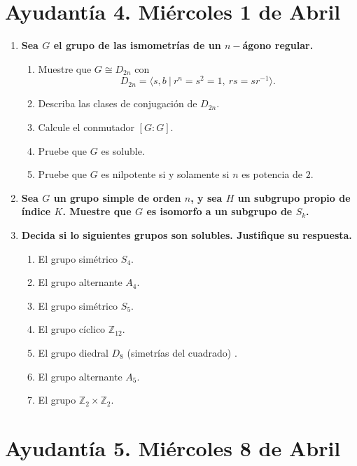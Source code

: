 \documentclass{article}
\theoremstyle{definition}
\theoremstyle{remark}
\numberwithin{equation}{section}
\begin{document}
\newpage
\section{Ayudantía 4. Miércoles 1 de Abril}


\begin{enumerate}

\item \textbf{Sea $G$ el grupo de las ismometrías de un $n-$ágono regular.}

\begin{enumerate}
\item Muestre que $G \cong D_{2n}$ con 
$$D_{2n}= \langle s,b \ | \ r^n=s^2=1, \ rs=sr^{-1} \rangle.$$
\item Describa las clases de conjugación de $D_{2n}$.

\item Calcule el conmutador $[G:G].$
\item Pruebe que $G$ es soluble.
\item Pruebe que $G$ es nilpotente si y solamente si $n$ es potencia de $2$.

\end{enumerate}
\item \textbf{Sea $G$ un grupo simple de orden $n$, y sea $H$ un subgrupo propio de índice $K$. Muestre que $G$ es isomorfo a un subgrupo de $S_k$.}

\item \textbf{Decida si lo siguientes grupos son solubles. Justifique su respuesta.}
\begin{enumerate}
\item El grupo simétrico $S_4.$
\item El grupo alternante $A_4$.
\item El grupo simétrico $S_5$.
\item El grupo cíclico $\mathbb{Z}_{12}$.
\item El grupo diedral $D_8$ (simetrías del cuadrado) .
\item El grupo alternante $A_5$.
\item El grupo $\mathbb{Z}_2 \times \mathbb{Z}_2$.
\end{enumerate}
\end{enumerate}



\newpage
\section{Ayudantía 5. Miércoles 8 de Abril}
\end{document}
